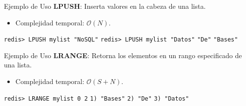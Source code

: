 \begin{frame}{Ejemplo de Uso}
    \textbf{LPUSH}: Inserta valores en la cabeza de una lista.
    \begin{itemize}
        \item Complejidad temporal: $\mathcal{O}(N)$.
    \end{itemize}
    
    \texttt{redis> LPUSH mylist "NoSQL"} \newline
    \texttt{redis> LPUSH mylist "Datos"} \texttt{"De"} \texttt{"Bases"}

\end{frame}
\begin{frame}{Ejemplo de Uso}
    \textbf{LRANGE}: Retorna los elementos en un rango especificado de una lista.
    \begin{itemize}
        \item Complejidad temporal: $\mathcal{O}(S + N)$.
    \end{itemize}
    \texttt{redis> LRANGE mylist 0 2} \newline
    \texttt{1) "Bases"} \newline
    \texttt{2) "De"} \newline
    \texttt{3) "Datos"} 
\end{frame}
